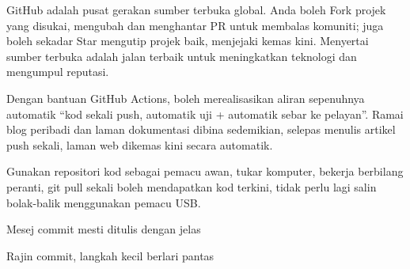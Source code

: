 

GitHub adalah pusat gerakan sumber terbuka global. Anda boleh Fork projek yang disukai, mengubah dan menghantar PR untuk membalas komuniti; juga boleh sekadar Star mengutip projek baik, menjejaki kemas kini. Menyertai sumber terbuka adalah jalan terbaik untuk meningkatkan teknologi dan mengumpul reputasi.


Dengan bantuan GitHub Actions, boleh merealisasikan aliran sepenuhnya automatik “kod sekali push, automatik uji + automatik sebar ke pelayan”. Ramai blog peribadi dan laman dokumentasi dibina sedemikian, selepas menulis artikel push sekali, laman web dikemas kini secara automatik.


Gunakan repositori kod sebagai pemacu awan, tukar komputer, bekerja berbilang peranti, git pull sekali boleh mendapatkan kod terkini, tidak perlu lagi salin bolak-balik menggunakan pemacu USB.


Mesej commit mesti ditulis dengan jelas


Rajin commit, langkah kecil berlari pantas


